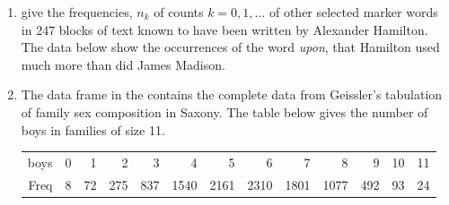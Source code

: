 \documentclass[11pt]{book}
\renewenvironment{knitrout}{\small\renewcommand{\baselinestretch}{.85}}{} %
\begin{document}
\begin{enumerate}
  \item \citet[Table 2.4]{MostellerWallace:63} give the frequencies, $n_k$
  of counts $k = 0, 1, \dots$ of other selected marker words in 247 blocks
  of text known to have been written by Alexander Hamilton.  The data below
  show the occurrences of the word \emph{upon}, that Hamilton used much more than
  did James Madison.
\begin{knitrout}
\color{fgcolor}\begin{kframe}
\begin{alltt}
 \hlkwb{<-} \hlopt{:}
 \hlkwb{<-} \hlstd{(}\hlstd{,} \hlstd{,} \hlstd{,} \hlstd{,} \hlstd{,} \hlstd{)}
\end{alltt}
\end{kframe}
\end{knitrout}

  \item The data frame  in the  contains the complete data from Geissler's \citeyearpar{Geissler:1889} tabulation of family sex composition in Saxony.  The table below gives the number of boys in families of size 11.

\begin{tabular}{rrrrrrrrrrrrr}
  \hline
boys &   0 &   1 &   2 &   3 &   4 &   5 &   6 &   7 &   8 &   9 &  10 &  11 \\ 
  Freq &   8 &  72 & 275 & 837 & 1540 & 2161 & 2310 & 1801 & 1077 & 492 &  93 &  24 \\ 
   \hline
\end{tabular}


\end{enumerate}
\end{document}

